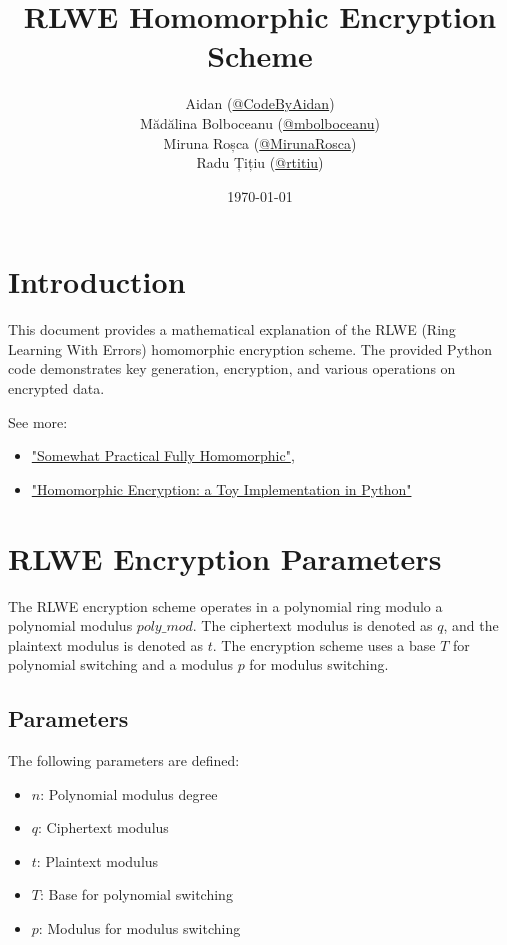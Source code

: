 \documentclass{article}
\title{RLWE Homomorphic Encryption Scheme}
\author{
  Aidan (\href{https://github.com}{@CodeByAidan}) \\
  Mădălina Bolboceanu (\href{https://github.com/mbolboceanu}{@mbolboceanu}) \\
  Miruna Roșca (\href{https://github.com/MirunaRosca}{@MirunaRosca}) \\
  Radu Țițiu (\href{https://github.com/rtitiu}{@rtitiu})
}
\date{\today}
\begin{document}
\maketitle

\section{Introduction}

This document provides a mathematical explanation of the RLWE (Ring Learning With Errors) homomorphic encryption scheme. The provided Python code demonstrates key generation, encryption, and various operations on encrypted data.

See more: 

\begin{itemize}
    \item \href{https://eprint.iacr.org/2012/144.pdf}{"Somewhat Practical Fully Homomorphic"}, 
    \item \href{https://bit-ml.github.io/blog/post/homomorphic-encryption-toy-implementation-in-python/}{"Homomorphic Encryption: a Toy Implementation in Python"}
\end{itemize}

\section{RLWE Encryption Parameters}

The RLWE encryption scheme operates in a polynomial ring modulo a polynomial modulus $poly\_mod$. The ciphertext modulus is denoted as $q$, and the plaintext modulus is denoted as $t$. The encryption scheme uses a base $T$ for polynomial switching and a modulus $p$ for modulus switching.

\subsection{Parameters}

The following parameters are defined:

\begin{itemize}
    \item $n$: Polynomial modulus degree
    \item $q$: Ciphertext modulus
    \item $t$: Plaintext modulus
    \item $T$: Base for polynomial switching
    \item $p$: Modulus for modulus switching
\end{itemize}
\end{document}
